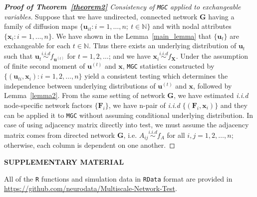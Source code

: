 \documentclass[12pt]{article}
\theoremstyle{definition}
\begin{document}
\begin{proof}[\textbf{Proof of Theorem~\ref{theorem2}} Consistency of \texttt{MGC} applied to exchangeable variables]

Suppose that we have undirected, connected network $\mathbf{G}$ having a family of diffusion maps $\{ \mathbf{u}_{it} : i = 1, \ldots , n ; ~t \in \mathbb{N} \}$ and with nodal attributes $\{ \mathbf{x}_{i} :  i = 1, \ldots , n  \}$. We have shown in the Lemma~\ref{main_lemma} that $\{ \mathbf{u}_{t}  \}$ are exchangeable for each $t \in \mathbb{N}$. Thus there exists an underlying distribution of $\mathbf{u}_{t}$ such that $\mathbf{u}_{t} \overset{i.i.d}{\sim} f_{\mathbf{u}^{(t)}}$ for $t= 1,2,\ldots $; and we have $\mathbf{x}_{i} \overset{i.i.d}{\sim} f_{\mathbf{X}}$. Under the assumption of finite second moment of $\mathbf{u}^{(t)}$ and $\mathbf{x}$, \texttt{MGC} statistics constructed by $\{  (  \mathbf{u}_{ti}, \mathbf{x}_{i} ) : i = 1,2,\ldots, n  \}$ yield a consistent testing which determines the independence between underlying distributions of $\mathbf{u}^{(t)}$ and $\mathbf{x}$, followed by Lemma~\ref{lemma2}. 
From the same setting of network $\mathbf{G}$, we have estimated \textit{i.i.d} node-specific network factors $\{ \mathbf{F}_{i} \}$, we have n-pair of \textit{i.i.d} $\{ ( \mathbf{F}_{i}, \mathbf{x}_{i} )  \}$ and they can be applied it to \texttt{MGC} without assuming conditional underlying distribution. In case of using adjacency matrix directly into test, we must assume the adjacency matrix comes from directed network $\mathbf{G}$, i.e. $A_{ij} \overset{i.i.d}{\sim} f_{A}$ for all $i,j=1,2,\ldots, n$; otherwise, each column is dependent on one another.  
\end{proof}




	
\bigskip
\begin{center}
	{\large\bf SUPPLEMENTARY MATERIAL}
\end{center}
	
All of the \texttt{R} functions and simulation data in \texttt{RData} format are provided in \url{https://github.com/neurodata/Multiscale-Network-Test}.
	
	
\end{document}
